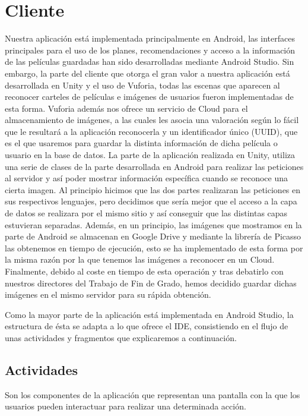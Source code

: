 \section{Cliente}
\label{makereference4.4}
Nuestra aplicación está implementada principalmente en Android, las interfaces principales para el uso de los planes, recomendaciones y acceso a la información de las películas guardadas han sido desarrolladas mediante Android Studio. Sin embargo,
la parte del cliente que otorga el gran valor a nuestra aplicación está desarrollada en Unity y el uso de Vuforia, todas las escenas que aparecen al reconocer carteles de películas e imágenes de usuarios fueron implementadas de esta forma. Vuforia además nos ofrece un
servicio de Cloud para el almacenamiento de imágenes, a las cuales les asocia una valoración según lo fácil que le resultará a la aplicación reconocerla y un identificador único (UUID), que es el que usaremos para guardar la distinta información de dicha película o usuario en la base de datos.
La parte de la aplicación realizada en Unity, utiliza una serie de clases de la parte desarrollada en Android para realizar las peticiones al servidor y así poder mostrar información específica cuando se reconoce una cierta imagen.
Al principio hicimos que las dos partes realizaran las peticiones en sus respectivos lenguajes, pero decidimos que sería mejor que el acceso a la capa de datos se realizara por el mismo sitio y así conseguir que las distintas capas estuvieran separadas.
Además, en un principio, las imágenes que mostramos en la parte de Android se almacenan en Google Drive y mediante la librería de Picasso las obtenemos en tiempo de ejecución, esto se ha implementado de esta forma por la misma razón por la que tenemos las imágenes a reconocer en un Cloud.
Finalmente, debido al coste en tiempo de esta operación y tras debatirlo con nuestros directores del Trabajo de Fin de Grado, hemos decidido guardar dichas imágenes en el mismo servidor para su rápida obtención.


Como la mayor parte de la aplicación está implementada en Android Studio, la estructura de ésta se adapta a lo que ofrece el IDE, consistiendo en el flujo de unas actividades y fragmentos que explicaremos a continuación.


\subsection{Actividades}
\label{makereference4.4.1}
Son los componentes de la aplicación que representan una pantalla con la que los usuarios pueden interactuar para realizar una determinada acción.

